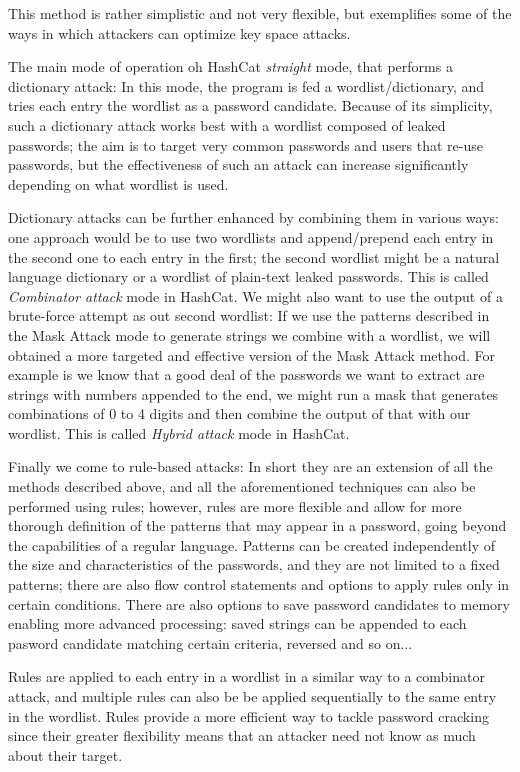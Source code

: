 This method is rather simplistic and not very flexible, but exemplifies some of the ways in which attackers can optimize key space attacks.\newline

The main mode of operation oh HashCat \emph{straight} mode, that performs a dictionary attack: In this mode, the program is fed a wordlist/dictionary, and tries each entry the wordlist as a password candidate. Because of its simplicity, such a dictionary attack works best with a wordlist composed of leaked passwords; the aim is to target very common passwords and users that re-use passwords, but the effectiveness of such an attack can increase significantly depending on what wordlist is used.

Dictionary attacks can be further enhanced by combining them in various ways: one approach would be to use two wordlists and append/prepend each entry in the second one to each entry in the first; 
the second wordlist might be a natural language dictionary or a wordlist of plain-text leaked passwords. This is called \emph{Combinator attack} mode in HashCat. 
We might also want to use the output of a brute-force attempt as out second wordlist: If we use the patterns described in the Mask Attack mode to generate strings we combine with a wordlist, we will obtained a more targeted and effective version of the Mask Attack method. 
For example is we know that a good deal of the passwords we want to extract are strings with numbers appended to the end, we might run a mask that generates combinations of 0 to 4 digits and then combine the output of that with our wordlist. This is called \emph{Hybrid attack } mode in HashCat.\newline

Finally we come to rule-based attacks: In short they are an extension of all the methods described above, and all the aforementioned techniques can also be performed using rules; however, rules are more flexible and allow for more thorough definition of the patterns that may appear in a password, going beyond the capabilities of a regular language.
Patterns can be created independently of the size and characteristics of the passwords, and they are not limited to a fixed patterns; there are also flow control statements and options to apply rules only in certain conditions.
There are also options to save password candidates to memory enabling more advanced processing: saved strings can be appended to each pasword candidate matching certain criteria, reversed and so on...

Rules are applied to each entry in a wordlist in a similar way to a combinator attack, and multiple rules can also be be applied sequentially to the same entry in the wordlist.
Rules provide a more efficient way to tackle password cracking since their greater flexibility means that an attacker need not know as much about their target. 


